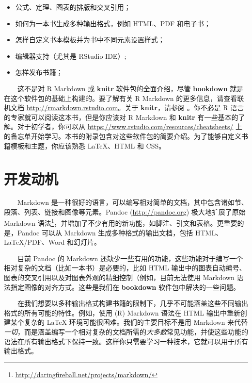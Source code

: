\documentclass[
  12pt,
]{krantz}
\providecommand{\tightlist}{%
  \setlength{\itemsep}{0pt}\setlength{\parskip}{0pt}}
\renewcommand{\href}[2]{#2\footnote{\url{#1}}}
\theoremstyle{definition}
\theoremstyle{definition}
\theoremstyle{definition}
\theoremstyle{definition}
\theoremstyle{remark}
\begin{document}
\begin{itemize}
\tightlist
\item
  公式、定理、图表的排版和交叉引用；
\item
  如何为一本书生成多种输出格式，例如 HTML、PDF 和电子书；
\item
  怎样自定义书本模板并为书中不同元素设置样式；
\item
  编辑器支持（尤其是 RStudio IDE）;
\item
  怎样发布书籍；
\end{itemize}

  这不是对 R Markdown 或 \textbf{knitr} 软件包\citep{R-knitr}的全面介绍，尽管 \textbf{bookdown} 就是在这个软件包的基础上构建的。要了解有关 R Markdown 的更多信息，请查看联机文档 \url{http://rmarkdown.rstudio.com}。关于 \textbf{knitr}，请参阅 \citet{xie2015}。你不必是 R 语言\citep{R-base}的专家就可以阅读这本书，但是你应该对 R Markdown 和 \textbf{knitr} 有一些基本的了解。对于初学者，你可以从 \url{https://www.rstudio.com/resources/cheatsheets/} 上的备忘单开始学习。本书的附录包含对这些软件包的简要介绍。为了能够自定义书籍模板和主题，你应该熟悉 LaTeX、HTML 和 CSS。

\hypertarget{ux5f00ux53d1ux52a8ux673a}{%
\section{开发动机}\label{ux5f00ux53d1ux52a8ux673a}}

  Markdown 是一种很好的语言，可以编写相对简单的文档，其中包含诸如节、段落、列表、链接和图像等元素。Pandoc (\url{http://pandoc.org}) 极大地扩展了\href{http://daringfireball.net/projects/markdown/}{原始 Markdown 语法}，并增加了不少有用的新功能，如脚注、引文和表格。更重要的是，Pandoc 可以从 Markdown 生成多种格式的输出文档，包括 HTML、LaTeX/PDF、Word 和幻灯片。

  目前 Pandoc 的 Markdown 还缺少一些有用的功能，这些功能对于编写一个相对复杂的文档（比如一本书）是必要的，比如 HTML 输出中的图表自动编号、图表的交叉引用以及对图表外观的精细控制（例如，目前无法使用 Markdown 语法指定图像的对齐方式。这些是我们在 \textbf{bookdown} 软件包中解决的一些问题。

  在我们想要以多种输出格式构建书籍的限制下，几乎不可能涵盖这些不同输出格式的所有可能的特性。例如，使用 (R) Markdown 语法在 HTML 输出中重新创建某个复杂的 LaTeX 环境可能很困难。我们的主要目标不是用 Markdown 来代替\emph{一切}，而是涵盖编写一个相对复杂的文档所需的\emph{大多数}常见功能，并使这些功能的语法在所有输出格式下保持一致。这样你只需要学习一种技术，它就可以用于所有输出格式。
\end{document}
